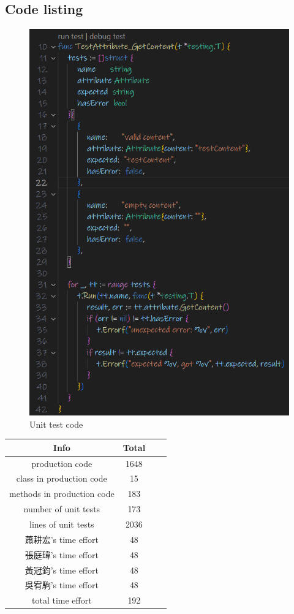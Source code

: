 \documentclass[12pt]{article}
\begin{document}
    \subsection{Code listing}

    \begin{figure}[H]
        \begin{center}
            \includegraphics[width=0.4\linewidth]
            {assets/hw5/unit_test_code.png}
            \caption{Unit test code}
        \end{center}
    \end{figure}


    \begin{CJK*}{UTF8}{bsmi}
        \begin{longtable}{|c|c|c|c|}
            \hline
            Info                       & Total \\
            \hline
            \endfirsthead
            \endhead
            \hline
            production code            & 1648  \\
            class in production code   & 15    \\
            methods in production code & 183   \\
            number of unit tests       & 173   \\
            lines of unit tests        & 2036  \\
            蕭耕宏's time effort          & 48    \\
            張庭瑋's time effort          & 48    \\
            黃冠鈞's time effort          & 48    \\
            吳宥駒's time effort          & 48    \\
            total time effort          & 192   \\
            \hline
        \end{longtable}
    \end{CJK*}
\end{document}
